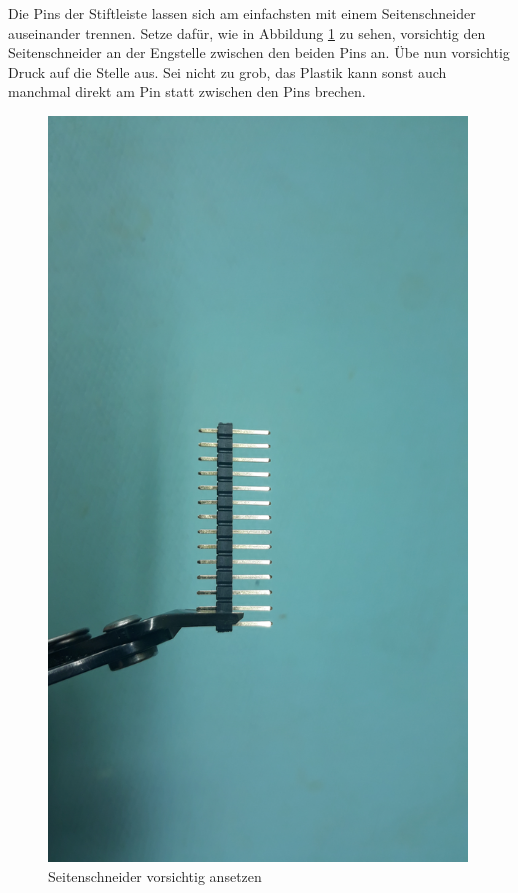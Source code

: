 \documentclass[12pt, a4paper]{article}		%
\begin{document}
Die Pins der Stiftleiste lassen sich am einfachsten mit einem Seitenschneider auseinander trennen. Setze dafür, wie in Abbildung \ref{fig:20200726_121903} zu sehen, vorsichtig den Seitenschneider an der Engstelle zwischen den beiden Pins an. Übe nun vorsichtig Druck auf die Stelle aus. Sei nicht zu grob, das Plastik kann sonst auch manchmal direkt am Pin statt zwischen den Pins brechen.

\begin{minipage}[t]{0.49\textwidth}
\begin{figure}[H]
	\centering
		\includegraphics[width=0.99\textwidth]{Grafiken/20200726_121903.jpg}
	\caption{Seitenschneider vorsichtig ansetzen}
	\label{fig:20200726_121903}
\end{figure}
\end{minipage}
\end{document}
